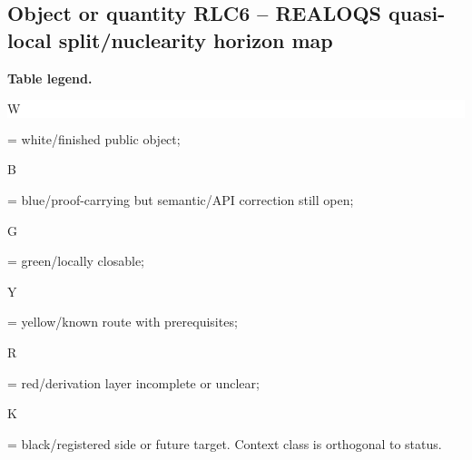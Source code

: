 \subsection*{Object or quantity RLC6 -- REALOQS quasi-local split/\allowbreak{}nuclearity horizon map}
\hypertarget{objproof:RLC6}{}
\par\smallskip\noindent\begin{minipage}{0.99\linewidth}\footnotesize\raggedright\textbf{Table legend.} \colorbox{white}{\strut W} = white/finished public object; \colorbox{cyan!20}{\strut B} = blue/proof-carrying but semantic/API correction still open; \colorbox{green!18}{\strut G} = green/locally closable; \colorbox{yellow!25}{\strut Y} = yellow/known route with prerequisites; \colorbox{red!20}{\strut R} = red/derivation layer incomplete or unclear; \colorbox{black!18}{\strut K} = black/registered side or future target. Context class is orthogonal to status.\end{minipage}\par\vspace{0.25em}
